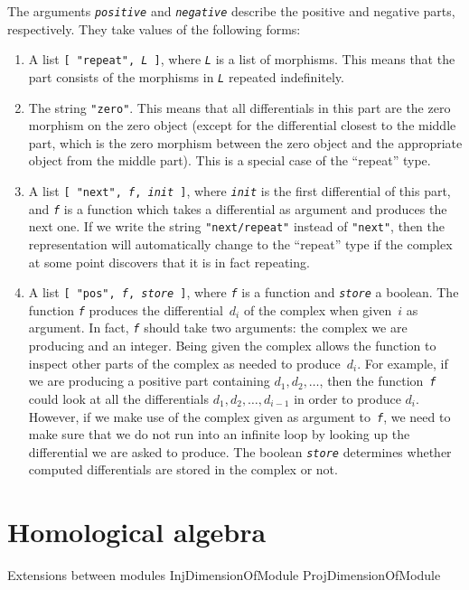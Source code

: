 \documentclass{amsart}
\theoremstyle{definition}
\newcommand{\code}[1]{\texttt{#1}}
\newcommand{\Arg}[1]{\texttt{\textit{#1}}}
\theoremstyle{theoretic}
\begin{document}
The arguments \Arg{positive} and \Arg{negative} describe the positive
and negative parts, respectively.  They take values of the following
forms:
\begin{enumerate}
\item A list \code{[ "repeat", \Arg{L} ]}, where \Arg{L} is a list of
morphisms.  This means that the part consists of the morphisms in
\Arg{L} repeated indefinitely.
\item The string \code{"zero"}.  This means that all differentials in
this part are the zero morphism on the zero object (except for the
differential closest to the middle part, which is the zero morphism
between the zero object and the appropriate object from the middle
part).  This is a special case of the ``repeat'' type.
\item A list \code{[ "next", \Arg{f}, \Arg{init} ]}, where \Arg{init}
is the first differential of this part, and \Arg{f} is a function
which takes a differential as argument and produces the next one.  If
we write the string \code{"next/repeat"} instead of \code{"next"},
then the representation will automatically change to the ``repeat''
type if the complex at some point discovers that it is in fact
repeating.
\item A list \code{[ "pos", \Arg{f}, \Arg{store} ]}, where \Arg{f} is
a function and \Arg{store} a boolean.  The function \Arg{f} produces
the differential~$d_i$ of the complex when given~$i$ as argument.  In
fact, \Arg{f} should take two arguments: the complex we are producing
and an integer.  Being given the complex allows the function to
inspect other parts of the complex as needed to produce~$d_i$.  For
example, if we are producing a positive part containing $d_1, d_2,
\ldots$, then the function~\Arg{f} could look at all the differentials
$d_1, d_2, \ldots, d_{i-1}$ in order to produce $d_i$.  However, if we
make use of the complex given as argument to~\Arg{f}, we need to make
sure that we do not run into an infinite loop by looking up the
differential we are asked to produce.  The boolean \Arg{store}
determines whether computed differentials are stored in the complex or
not.
\end{enumerate}

\section{Homological algebra}





Extensions between modules
InjDimensionOfModule
ProjDimensionOfModule
\end{document}
